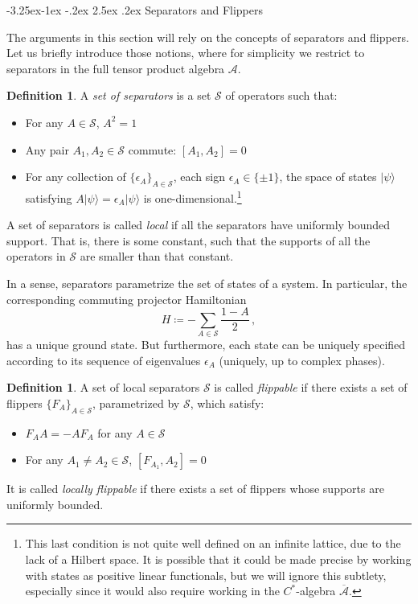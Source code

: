 \documentclass[aps,twocolumn,prx,floatfix,preprintnumbers, nofootinbib,10pt]{revtex4-2}
\makeatletter
\numberwithin{equation}{section}
\theoremstyle{definition}
\newtheorem{definition}[theorem]{Definition}
\theoremstyle{remark}
\theoremstyle{claim}
\newcommand{\be}{\begin{equation}}
\newcommand{\ee}{\end{equation}}
\renewcommand\subsubsection{\@startsection{subsubsection}{3}{\z@}%
                                     {-3.25ex\@plus -1ex \@minus -.2ex}%
                                     {2.5ex \@plus .2ex}%
                                     {\centering\itshape\bfseries\small}}
\def\ket#1{{|{#1}\rangle}}
\newcommand{\mc}[1]{\mathcal{#1}}
\makeatother
\begin{document}
\subsubsection{Separators and Flippers}

The arguments in this section will rely on the concepts of separators and flippers. Let us briefly introduce those notions, where for simplicity we restrict to separators in the full tensor product algebra $\mathcal{A}$.

\begin{definition}
A \emph{set of separators} is a set $\mathcal{S}$ of operators such that:
 \begin{itemize}
  \item For any $A \in \mathcal{S}$, $A^2 = 1$

  \item Any pair $A_1, A_2 \in \mathcal{S}$ commute: $[A_1, A_2] = 0$

  \item For any collection of $\{ \epsilon_A \}_{A \in \mathcal{S}}$, each sign $\epsilon_A \in \{ \pm 1 \}$, the space of states $\ket{\psi}$ satisfying $A \ket{\psi} = \epsilon_A \ket{\psi}$ is one-dimensional.\footnote{This last condition is not quite well defined on an infinite lattice, due to the lack of a Hilbert space. It is possible that it could be made precise by working with states as positive linear functionals, but we will ignore this subtlety, especially since it would also require working in the $C^*$-algebra $\overline{\mc{A}}$.}
 \end{itemize}

A set of separators is called \emph{local} if all the separators have uniformly bounded support. That is, there is some constant, such that the supports of all the operators in $\mathcal{S}$ are smaller than that constant.
\end{definition}

In a sense, separators parametrize the set of states of a system. In particular, the corresponding commuting projector Hamiltonian
\be
H \coloneqq - \sum_{A \in \mathcal{S}} \frac{1 - A}{2} \,,
\ee
has a unique ground state. But furthermore, each state can be uniquely specified according to its sequence of eigenvalues $\epsilon_A$ (uniquely, up to complex phases).

\begin{definition}
 A set of local separators $\mc{S}$ is called \emph{flippable} if there exists a set of flippers $\{F_A\}_{A \in \mc{S}}$, parametrized by $\mc{S}$, which satisfy:
 \begin{itemize}
  \item $F_A A = - A F_A$ for any $A \in \mc{S}$

  \item For any $A_1 \neq A_2 \in \mc{S}$, $[F_{A_1}, A_2] = 0$
 \end{itemize}

 It is called \emph{locally flippable} if there exists a set of flippers whose supports are uniformly bounded.
\end{definition}
\end{document}
